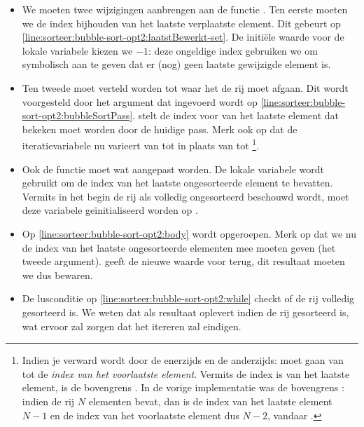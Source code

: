 
\begin{itemize}
  \item We moeten twee wijzigingen aanbrengen aan de functie . Ten eerste
        moeten we de index bijhouden van het laatste verplaatste element. Dit gebeurt
        op \cref{line:sorteer:bubble-sort-opt2:laatstBewerkt-set}. De initi\"ele waarde
        voor de lokale variabele  kiezen we $-1$:
        deze ongeldige index gebruiken we om symbolisch aan te geven dat
        er (nog) geen laatste gewijzigde element is.
  \item Ten tweede moet  verteld worden tot waar het de rij moet afgaan.
        Dit wordt voorgesteld door het argument  dat ingevoerd wordt
        op \cref{line:sorteer:bubble-sort-opt2:bubbleSortPass}.  stelt de index
        voor van het laatste element dat bekeken moet worden door de huidige pass.
        Merk ook op dat de iteratievariabele  nu varieert van
         tot  in plaats van tot \footnote{Indien
        je verward wordt door de  enerzijds en de  anderzijds:
         moet gaan van  tot de \emph{index van het voorlaatste element}.
        Vermits  de index is van het laatste element, is de bovengrens .
        In de vorige implementatie was de bovengrens : indien de rij $N$ elementen
        bevat, dan is de index van het laatste element $N-1$ en de index van het voorlaatste element dus
        $N-2$, vandaar .}.
  \item Ook de functie  moet wat aangepast worden.
        De lokale variabele  wordt gebruikt
        om de index van het laatste ongesorteerde element te bevatten.
        Vermits in het begin de rij als volledig ongesorteerd beschouwd wordt,
        moet deze variabele ge\"initialiseerd worden op .
  \item Op \cref{line:sorteer:bubble-sort-opt2:body} wordt  opgeroepen.
        Merk op dat we nu de index van het laatste ongesorteerde elementen mee moeten geven
        (het tweede argument).  geeft de nieuwe
        waarde voor  terug, dit resultaat moeten we dus bewaren.
  \item De lusconditie op \cref{line:sorteer:bubble-sort-opt2:while} checkt
        of de rij volledig gesorteerd is. We weten dat 
        als resultaat  oplevert indien de rij gesorteerd is,
        wat ervoor zal zorgen dat het itereren zal eindigen.
\end{itemize}

